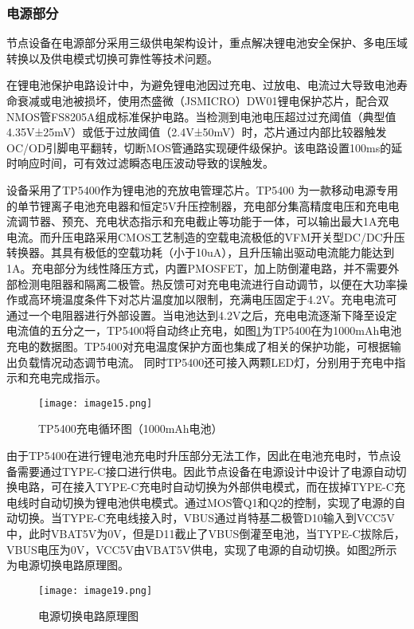 \subsubsection{电源部分}

节点设备在电源部分采用三级供电架构设计，重点解决锂电池安全保护、多电压域转换以及供电模式切换可靠性等技术问题。

在锂电池保护电路设计中，为避免锂电池因过充电、过放电、电流过大导致电池寿命衰减或电池被损坏，使用杰盛微（JSMICRO）DW01锂电保护芯片，配合双NMOS管FS8205A组成标准保护电路。当检测到电池电压超过过充阈值（典型值4.35V±25mV）或低于过放阈值（2.4V±50mV）时，芯片通过内部比较器触发OC/OD引脚电平翻转，切断MOS管通路实现硬件级保护。该电路设置100ms的延时响应时间，可有效过滤瞬态电压波动导致的误触发。

设备采用了TP5400作为锂电池的充放电管理芯片。TP5400 为一款移动电源专用的单节锂离子电池充电器和恒定5V升压控制器，充电部分集高精度电压和充电电流调节器、预充、充电状态指示和充电截止等功能于一体，可以输出最大1A充电电流。而升压电路采用CMOS工艺制造的空载电流极低的VFM开关型DC/DC升压转换器。其具有极低的空载功耗（小于10uA），且升压输出驱动电流能力能达到1A。充电部分为线性降压方式，内置PMOSFET，加上防倒灌电路，并不需要外部检测电阻器和隔离二极管。热反馈可对充电电流进行自动调节，以便在大功率操作或高环境温度条件下对芯片温度加以限制，充满电压固定于4.2V。充电电流可通过一个电阻器进行外部设置。当电池达到4.2V之后，充电电流逐渐下降至设定电流值的五分之一，TP5400将自动终止充电，如图\ref{F.ECG_image15}为TP5400在为1000mAh电池充电的数据图\cite{TP5400}。TP5400对充电温度保护方面也集成了相关的保护功能，可根据输出负载情况动态调节电流。 同时TP5400还可接入两颗LED灯，分别用于充电中指示和充电完成指示。

\begin{figure}[hbt]
    \centering
    \texttt{[image: image15.png]}
    \caption{TP5400充电循环图（1000mAh电池）}
    \label{F.ECG_image15}
\end{figure}

由于TP5400在进行锂电池充电时升压部分无法工作，因此在电池充电时，节点设备需要通过TYPE-C接口进行供电。因此节点设备在电源设计中设计了电源自动切换电路，可在接入TYPE-C充电时自动切换为外部供电模式，而在拔掉TYPE-C充电线时自动切换为锂电池供电模式。通过MOS管Q1和Q2的控制，实现了电源的自动切换。当TYPE-C充电线接入时，VBUS通过肖特基二极管D10输入到VCC5V中，此时VBAT5V为0V，但是D11截止了VBUS倒灌至电池，当TYPE-C拔除后，VBUS电压为0V，VCC5V由VBAT5V供电，实现了电源的自动切换。如图\ref{F.ECG_image19}所示为电源切换电路原理图。

\begin{figure}[hbt]
    \centering
    \texttt{[image: image19.png]}
    \caption{电源切换电路原理图}
    \label{F.ECG_image19}
\end{figure}

